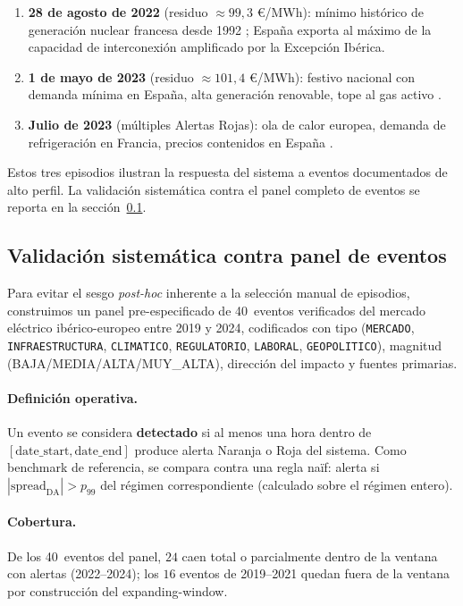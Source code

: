 \documentclass[11pt,a4paper]{article}
\begin{document}
\begin{enumerate}
\item \textbf{28 de agosto de 2022} (residuo $\approx 99{,}3$ €/MWh):
mínimo histórico de generación nuclear francesa desde 1992
\citep{RTE2023}; España exporta al máximo de la capacidad de
interconexión amplificado por la Excepción Ibérica.

\item \textbf{1 de mayo de 2023} (residuo $\approx 101{,}4$ €/MWh):
festivo nacional con demanda mínima en España, alta generación
renovable, tope al gas activo \citep{OMIE2023}.

\item \textbf{Julio de 2023} (múltiples Alertas Rojas):
ola de calor europea, demanda de refrigeración en Francia, precios
contenidos en España \citep{CNMC2024}.
\end{enumerate}

Estos tres episodios ilustran la respuesta del sistema a eventos
documentados de alto perfil. La validación sistemática contra el panel
completo de eventos se reporta en la sección~\ref{sec:event-validation}.

\subsection{Validación sistemática contra panel de eventos}\label{sec:event-validation}

Para evitar el sesgo \emph{post-hoc} inherente a la selección manual de
episodios, construimos un panel pre-especificado de 40~eventos
verificados del mercado eléctrico ibérico-europeo entre 2019 y 2024,
codificados con tipo (\texttt{MERCADO}, \texttt{INFRAESTRUCTURA},
\texttt{CLIMATICO}, \texttt{REGULATORIO}, \texttt{LABORAL},
\texttt{GEOPOLITICO}), magnitud (BAJA/MEDIA/ALTA/MUY\_ALTA), dirección
del impacto y fuentes primarias.

\paragraph{Definición operativa.} Un evento se considera
\textbf{detectado} si al menos una hora dentro de
$[\text{date\_start}, \text{date\_end}]$ produce alerta Naranja o Roja
del sistema. Como benchmark de referencia, se compara contra una regla
naïf: alerta si $|\mathrm{spread}_\text{DA}| > p_{99}$ del régimen
correspondiente (calculado sobre el régimen entero).

\paragraph{Cobertura.} De los 40~eventos del panel, $24$ caen total o
parcialmente dentro de la ventana con alertas (2022--2024); los $16$
eventos de 2019--2021 quedan fuera de la ventana por construcción del
expanding-window.
\end{document}
